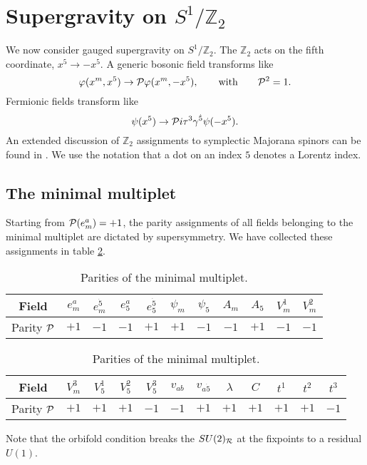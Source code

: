 \documentclass[a4paper,12pt, twoside]{article}
\numberwithin{equation}{section}
\begin{document}
\section{Supergravity on $S^1/\mathbb{Z}_2$}\label{sgs}
We now consider gauged supergravity on $S^1/\mathbb{Z}_2$. The 
$\mathbb{Z}_2$ acts on the fifth coordinate, $x^5\to -x^5$. A generic bosonic 
field transforms like
\[
\varphi(x^m,x^5)\to{\cal P}\varphi(x^m,-x^5),\qquad \mbox{with}\qquad 
{\cal P}^2=1.
\]
Fermionic fields transform like
\begin{equation}
\psi(x^5)\to {\cal P}i\tau^3\gamma^{\dot{5}}\psi(-x^5).\label{proj}
\end{equation}
An extended discussion of $\mathbb{Z}_2$ assignments to symplectic 
Majorana spinors can be found in \cite{Bergshoeff:2000zn}. We use the 
notation that a dot on an index $5$ denotes a Lorentz index.
\subsection{The minimal multiplet}\label{sugzs}
Starting from ${\cal P}(e_m^a)=+1$, the parity assignments of all 
fields belonging to the minimal multiplet are dictated by supersymmetry. We 
have collected these assignments in table \ref{table3022}.
\begin{table}
\begin{center}
\begin{tabular}{|c|c|c|c|c|c|c|c|c|c|c|}
\hline\hline
Field & $e_m^a$ & $e_m^{\dot{5}}$ & $e_5^a$ & $e_5^{\dot{5}}$ & 
$\psi_m$ & $\psi_5$ & $A_m$ & $A_5$ & $V_m^1$&  $V_m^2$\\
\hline
Parity $\cal P$&$+1$&$-1$&$-1$&$+1$&$+1$&$-1$&$-1$&$+1$&$-1$&$-1$\\
\hline
\end{tabular}
\begin{tabular}{|c|c|c|c|c|c|c|c|c|c|c|c|}
\hline
Field&  $V_m^3$& $V_5^1$ & $V_5^2$ & $V_5^3$ &$v_{ab}$ & $v_{a\dot{5}}$ 
& $\lambda$ & $C$ & $t^1$& $t^2$ & $t^3$ \\
\hline
Parity $\cal 
P$&$+1$&$+1$&$+1$&$-1$&$-1$&$+1$&$+1$&$+1$&$+1$&$+1$&$-1$\\
\hline\hline
\end{tabular}
\end{center}
\caption{Parities of the minimal multiplet.}\label{table3022}
\end{table}
Note that the orbifold condition breaks the $SU(2)_{\cal R}$ at the 
fixpoints to a residual $U(1)$.
\end{document}
